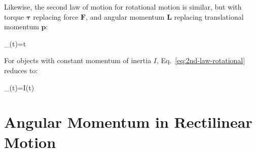 Likewise, the second law of motion for rotational motion is similar, but with
torque $\bm\tau$ replacing force $\bm F$, and angular momentum $\bm L$
replacing translational momentum $\bm p$:
\begin{important-equation}
  \bm\tau_(t)=t
  \label{eq:2nd-law-rotational}
\end{important-equation}
For objects with constant momentum of inertia $I$,
Eq.~\ref{eq:2nd-law-rotational} reduces to:
\begin{important-equation}
  \bm\tau_(t)=I\bm\alpha(t)
  \quad{}
\end{important-equation}




\section{Angular Momentum in Rectilinear Motion}

